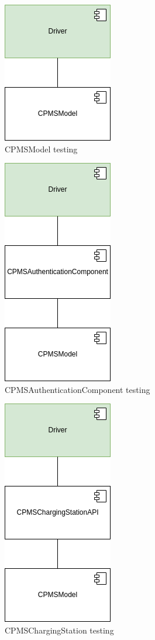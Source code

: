\begin{figure}[H]
    \centering
    \includegraphics[keepaspectratio]{Testing/CPMS/cpms-CPMSModel.drawio.png}
    \caption{\ac{CPMS}Model testing}
\end{figure}
\begin{figure}[H]
    \centering
    \includegraphics[keepaspectratio]{Testing/CPMS/cpms-CPMSAuthenticationComponent.drawio.png}
    \caption{\ac{CPMS}AuthenticationComponent testing}
\end{figure}
\begin{figure}[H]
    \centering
    \includegraphics[keepaspectratio]{Testing/CPMS/cpms-CPMSCharging.drawio.png}
    \caption{\ac{CPMS}ChargingStation testing}
\end{figure}
